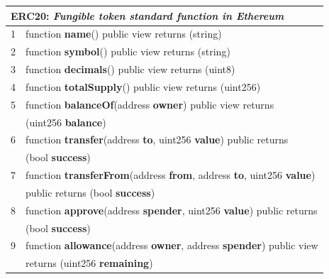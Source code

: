 \begin{center}
    \begin{tabular}{c p{}}
        \hline
        \multicolumn{2}{l}{\textbf{ERC20:} \textit{Fungible token standard
                function
                in Ethereum}}
        \\ \hline
        1 & \hspace{1em} function \textbf{name}() public view returns (string)
        \\
        2 & \hspace{1em} function \textbf{symbol}() public view returns
        (string)
        \\
        3 & \hspace{1em} function \textbf{decimals}() public view returns
        (uint8)
        \\
        4 & \hspace{1em} function \textbf{totalSupply}() public view returns
        (uint256)
        \\
        5 & \hspace{1em} function \textbf{balanceOf}(address \textbf{owner})
        public view returns                                                    \\
          & \hspace{1em}(uint256 \textbf{balance})                             \\
        6 & \hspace{1em} function \textbf{transfer}(address \textbf{to},
        uint256
        \textbf{value}) public returns                                         \\
          & \hspace{1em} (bool \textbf{success})                               \\
        7 & \hspace{1em} function \textbf{transferFrom}(address \textbf{from},
        address \textbf{to}, uint256 \textbf{value})
        \\  & \hspace{1em}public returns (bool
           \textbf{success})
        \\
        8 & \hspace{1em} function \textbf{approve}(address \textbf{spender},
        uint256 \textbf{value}) public returns
        \\
          & \hspace{1em} (bool \textbf{success})                               \\
        9 & \hspace{1em} function \textbf{allowance}(address \textbf{owner},
        address \textbf{spender}) public view                                  \\
          & \hspace{1em}returns (uint256 \textbf{remaining})                   \\
        \hline
    \end{tabular}
\end{center}



